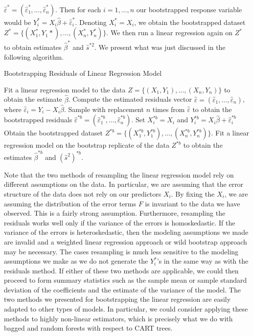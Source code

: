 \documentclass[12pt,twoside]{reedthesis}
\theoremstyle{definition}
\theoremstyle{definition}
\theoremstyle{definition}
\theoremstyle{remark}
\begin{document}
\(\hat{\varepsilon}^*=(\hat{\varepsilon}_1^*,\ldots, \hat{\varepsilon}_n^*)\).
Then for each \(i=1,\ldots,n\) our bootstrapped response variable would
be \(Y_i^*=X_i\hat{\beta}+\hat{\varepsilon}_i^*\). Denoting
\(X_i^*=X_i\), we obtain the bootstrapped dataset
\(Z^*=\{(X_1^*,Y_1*),\ldots,(X_n^*,Y_n^*)\}\). We then run a linear
regression again on \(Z^*\) to obtain estimates \(\hat{\beta}^*\) and
\(\hat{s}^{*2}\). We present what was just discussed in the following
algorithm.
\begin{algorithm}
        \caption{Bootstrapping Residuals of Linear Regression Model}\label{residuals resample}
        \begin{algorithmic}[1]
            \State Fit a linear regression model to the data $Z=\{(X_1,Y_1),\ldots,(X_n,Y_n)\}$ to obtain the estimate $\hat{\beta}$. 
            \State Compute the estimated residuals vector $\hat{\varepsilon}=(\hat{\varepsilon}_1,\ldots,\hat{\varepsilon}_n)$, where $\hat{\varepsilon}_i=Y_i-X_i\hat{\beta}$.
                \State Sample with replacement $n$ times from $\hat{\varepsilon}$ to obtain the bootstrapped residuals $\hat{\varepsilon}^{*b}=(\hat{\varepsilon}_1^{*b},\ldots,\hat{\varepsilon}_n^{*b})$.
                    \State Set $X_i^{*b}=X_i$ and $Y_i^{*b}=X_i\hat{\beta}+\hat{\varepsilon}_i^{*b}$
                \EndFor
                \State Obtain the bootstrapped dataset $Z^{*b}=\{(X_1^{*b}, Y_1^{*b}),\ldots, (X_n^{*b},Y_n^{*b})\}$.
                \State Fit a linear regression model on the bootstrap replicate of the data $Z^{*b}$ to obtain the estimates $\hat{\beta}^{*b}$ and $(\hat{s}^2)^{*b}$.
            \EndFor
        \end{algorithmic}
    \end{algorithm}
Note that the two methods of resampling the linear regression model rely
on different assumptions on the data. In particular, we are assuming
that the error structure of the data does not rely on our predictors
\(X_i\). By fixing the \(X_i\), we are assuming the distribution of the
error terms \(F\) is invariant to the data we have observed. This is a
fairly strong assumption. Furthermore, resampling the residuals works
well only if the variance of the errors is homoskedastic. If the
variance of the errors is heteroskedastic, then the modeling assumptions
we made are invalid and a weighted linear regression approach or wild
bootstrap approach may be necessary. The cases resampling is much less
sensitive to the modeling assumptions we make as we do not generate the
\(Y_i^*\)'s in the same way as with the residuals method. If either of
these two methods are applicable, we could then proceed to form summary
statistics such as the sample mean or sample standard deviation of the
coefficients and the estimate of the variance of the model. The two
methods we presented for bootstrapping the linear regression are easily
adapted to other types of models. In particular, we could consider
applying these methods to highly non-linear estimators, which is
precisely what we do with bagged and random forests with respect to CART
trees.
\end{document}
